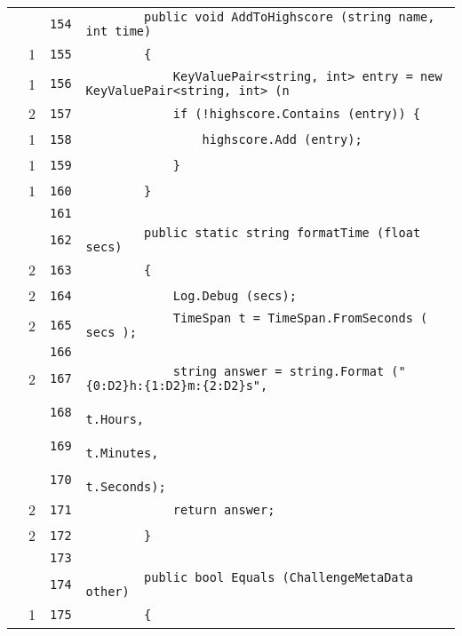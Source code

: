 \documentclass[a4paper,10pt]{article}
\begin{document}
\begin{longtable}[l]{lrrl}
\cellcolor{gray} &  & \verb~154~ & \verb~        public void AddToHighscore (string name, int time)~\\
\cellcolor{green} & 1 & \verb~155~ & \verb~        {~\\
\cellcolor{green} & 1 & \verb~156~ & \verb~            KeyValuePair<string, int> entry = new KeyValuePair<string, int> (n~\\
\cellcolor{green} & 2 & \verb~157~ & \verb~            if (!highscore.Contains (entry)) {~\\
\cellcolor{green} & 1 & \verb~158~ & \verb~                highscore.Add (entry);~\\
\cellcolor{green} & 1 & \verb~159~ & \verb~            }~\\
\cellcolor{green} & 1 & \verb~160~ & \verb~        }~\\
\cellcolor{gray} &  & \verb~161~ & \verb~~\\
\cellcolor{gray} &  & \verb~162~ & \verb~        public static string formatTime (float secs)~\\
\cellcolor{green} & 2 & \verb~163~ & \verb~        {~\\
\cellcolor{green} & 2 & \verb~164~ & \verb~            Log.Debug (secs);~\\
\cellcolor{green} & 2 & \verb~165~ & \verb~            TimeSpan t = TimeSpan.FromSeconds ( secs );~\\
\cellcolor{gray} &  & \verb~166~ & \verb~~\\
\cellcolor{green} & 2 & \verb~167~ & \verb~            string answer = string.Format ("{0:D2}h:{1:D2}m:{2:D2}s",~\\
\cellcolor{gray} &  & \verb~168~ & \verb~                                           t.Hours,~\\
\cellcolor{gray} &  & \verb~169~ & \verb~                                           t.Minutes,~\\
\cellcolor{gray} &  & \verb~170~ & \verb~                                           t.Seconds);~\\
\cellcolor{green} & 2 & \verb~171~ & \verb~            return answer;~\\
\cellcolor{green} & 2 & \verb~172~ & \verb~        }~\\
\cellcolor{gray} &  & \verb~173~ & \verb~~\\
\cellcolor{gray} &  & \verb~174~ & \verb~        public bool Equals (ChallengeMetaData other)~\\
\cellcolor{green} & 1 & \verb~175~ & \verb~        {~\\

\end{longtable}
\end{document}

